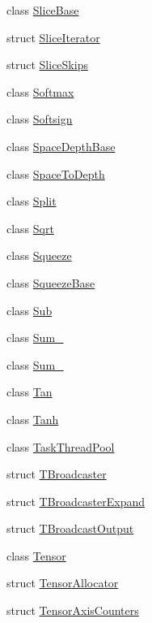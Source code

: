 \begin{DoxyCompactItemize}
\item 
class \mbox{\hyperlink{classonnxruntime_1_1SliceBase}{Slice\+Base}}
\item 
struct \mbox{\hyperlink{structonnxruntime_1_1SliceIterator}{Slice\+Iterator}}
\item 
struct \mbox{\hyperlink{structonnxruntime_1_1SliceSkips}{Slice\+Skips}}
\item 
class \mbox{\hyperlink{classonnxruntime_1_1Softmax}{Softmax}}
\item 
class \mbox{\hyperlink{classonnxruntime_1_1Softsign}{Softsign}}
\item 
class \mbox{\hyperlink{classonnxruntime_1_1SpaceDepthBase}{Space\+Depth\+Base}}
\item 
class \mbox{\hyperlink{classonnxruntime_1_1SpaceToDepth}{Space\+To\+Depth}}
\item 
class \mbox{\hyperlink{classonnxruntime_1_1Split}{Split}}
\item 
class \mbox{\hyperlink{classonnxruntime_1_1Sqrt}{Sqrt}}
\item 
class \mbox{\hyperlink{classonnxruntime_1_1Squeeze}{Squeeze}}
\item 
class \mbox{\hyperlink{classonnxruntime_1_1SqueezeBase}{Squeeze\+Base}}
\item 
class \mbox{\hyperlink{classonnxruntime_1_1Sub}{Sub}}
\item 
class \mbox{\hyperlink{classonnxruntime_1_1Sum__6}{Sum\+\_}}
\item 
class \mbox{\hyperlink{classonnxruntime_1_1Sum__8}{Sum\+\_}}
\item 
class \mbox{\hyperlink{classonnxruntime_1_1Tan}{Tan}}
\item 
class \mbox{\hyperlink{classonnxruntime_1_1Tanh}{Tanh}}
\item 
class \mbox{\hyperlink{classonnxruntime_1_1TaskThreadPool}{Task\+Thread\+Pool}}
\item 
struct \mbox{\hyperlink{structonnxruntime_1_1TBroadcaster}{T\+Broadcaster}}
\item 
struct \mbox{\hyperlink{structonnxruntime_1_1TBroadcasterExpand}{T\+Broadcaster\+Expand}}
\item 
struct \mbox{\hyperlink{structonnxruntime_1_1TBroadcastOutput}{T\+Broadcast\+Output}}
\item 
class \mbox{\hyperlink{classonnxruntime_1_1Tensor}{Tensor}}
\item 
struct \mbox{\hyperlink{structonnxruntime_1_1TensorAllocator}{Tensor\+Allocator}}
\item 
struct \mbox{\hyperlink{structonnxruntime_1_1TensorAxisCounters}{Tensor\+Axis\+Counters}}

\end{DoxyCompactItemize}
